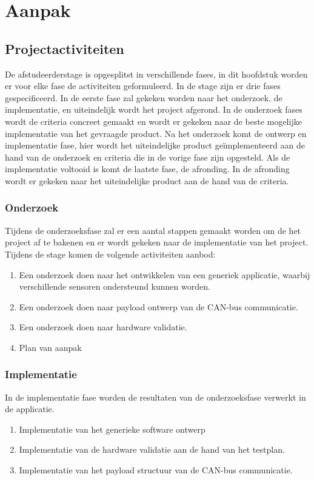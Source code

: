 \chapter{Aanpak} \label{ch:aanpak}

\section{Projectactiviteiten}
De afstudeerderstage is opgesplitst in verschillende fases, in dit hoofdstuk worden er voor elke fase de activiteiten geformuleerd. In de stage zijn er drie fases gespecificeerd. In de eerste fase zal gekeken worden naar het onderzoek, de implementatie, en uiteindelijk wordt het project afgerond. In de onderzoek fases wordt de criteria concreet gemaakt en wordt er gekeken naar de beste mogelijke implementatie van het gevraagde product. Na het onderzoek komt de ontwerp en implementatie fase, hier wordt het uiteindelijke product geïmplementeerd aan de hand van de onderzoek en criteria die in de vorige fase zijn opgesteld. Als de implementatie voltooid is komt de laatste fase, de afronding. In de afronding wordt er gekeken naar het uiteindelijke product aan de hand van de criteria.

\subsection{Onderzoek}
Tijdens de onderzoeksfase zal er een aantal stappen gemaakt worden om de het project af te bakenen en er wordt gekeken naar de implementatie van het project. Tijdens de stage komen de volgende activiteiten aanbod:
\begin{enumerate}
	\item Een onderzoek doen naar het ontwikkelen van een generiek applicatie, waarbij verschillende sensoren ondersteund kunnen worden.
	\item Een onderzoek doen naar payload ontwerp van de CAN-bus communicatie.
	\item Een onderzoek doen naar hardware validatie.
	\item Plan van aanpak
\end{enumerate}

\subsection{Implementatie}
In de implementatie fase worden de resultaten van de onderzoeksfase verwerkt in de applicatie. 
\begin{enumerate}
	\item Implementatie van het generieke software ontwerp
	\item Implementatie van de hardware validatie aan de hand van het testplan.
	\item Implementatie van het payload structuur van de CAN-bus communicatie.
\end{enumerate}

